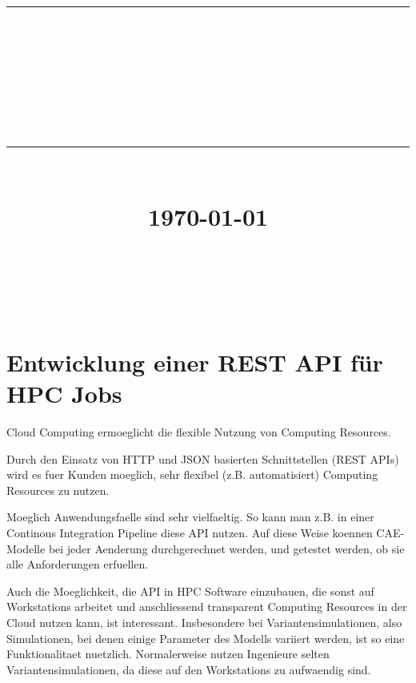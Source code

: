 \documentclass[12pt]{article}
\newcommand{\HRule}[1]{\rule{\linewidth}{#1}}
\begin{document}
\title{ \normalsize
		\HRule{0.5pt} \\
		\LARGE \textbf{\uppercase{\newCommandDiscipline}} \\
    \smallbreak
		\small\textbf{{\newCommandTerm}}\\
		\HRule{2pt} \\ [0.5cm]
		\normalsize \today \vspace*{10\baselineskip}}

\date{}

\author{
		\newCommandName \\
		\newCommandMatriculationNumber \\
		\newCommandUniversity \\
		\newCommandFaculty
}


\maketitle

\newpage



\sectionfont{\scshape}


\section{Entwicklung einer REST API für HPC Jobs}
Cloud Computing ermoeglicht die flexible Nutzung von Computing Resources.

Durch den Einsatz von HTTP und JSON basierten Schnittstellen (REST APIs) wird es fuer Kunden moeglich, sehr flexibel (z.B. automatisiert) Computing Resources zu nutzen.

Moeglich Anwendungsfaelle sind sehr vielfaeltig. So kann man z.B. in einer Continous Integration Pipeline diese API nutzen. Auf diese Weise koennen CAE-Modelle bei jeder Aenderung durchgerechnet werden, und getestet werden, ob sie alle Anforderungen erfuellen.

Auch die Moeglichkeit, die API in HPC Software einzubauen, die sonst auf Workstations arbeitet und anschliessend transparent Computing Resources in der Cloud nutzen kann, ist interessant. Insbesondere bei Variantensimulationen, also Simulationen, bei denen einige Parameter des Modells variiert werden, ist so eine Funktionalitaet nuetzlich. Normalerweise nutzen Ingenieure selten Variantensimulationen, da diese auf den Workstations zu aufwaendig sind.
\end{document}
